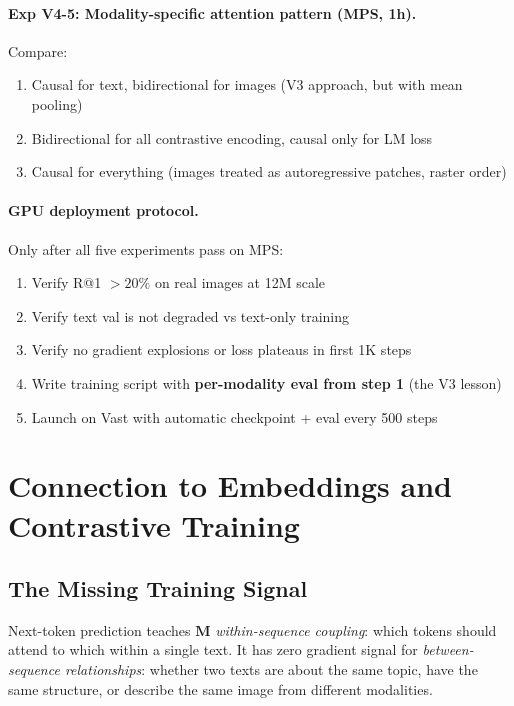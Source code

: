 \documentclass[11pt, a4paper]{article}
\newcommand{\M}{\mathbf{M}}
\theoremstyle{plain}
\theoremstyle{remark}
\begin{document}
\paragraph{Exp V4-5: Modality-specific attention pattern (MPS, 1h).}
Compare:
\begin{enumerate}[nosep, label=(\alph*)]
\item Causal for text, bidirectional for images (V3 approach, but with mean pooling)
\item Bidirectional for all contrastive encoding, causal only for LM loss
\item Causal for everything (images treated as autoregressive patches, raster order)
\end{enumerate}

\paragraph{GPU deployment protocol.}
Only after all five experiments pass on MPS:
\begin{enumerate}[nosep]
\item Verify R@1 $> 20\%$ on real images at 12M scale
\item Verify text val is not degraded vs text-only training
\item Verify no gradient explosions or loss plateaus in first 1K steps
\item Write training script with \textbf{per-modality eval from step 1} (the V3 lesson)
\item Launch on Vast with automatic checkpoint + eval every 500 steps
\end{enumerate}


\appendix
\section{Connection to Embeddings and Contrastive Training}
\label{sec:contrastive}

\subsection{The Missing Training Signal}

Next-token prediction teaches $\M$ \emph{within-sequence coupling}: which tokens should attend to which within a single text.
It has zero gradient signal for \emph{between-sequence relationships}: whether two texts are about the same topic, have the same structure, or describe the same image from different modalities.
\end{document}
